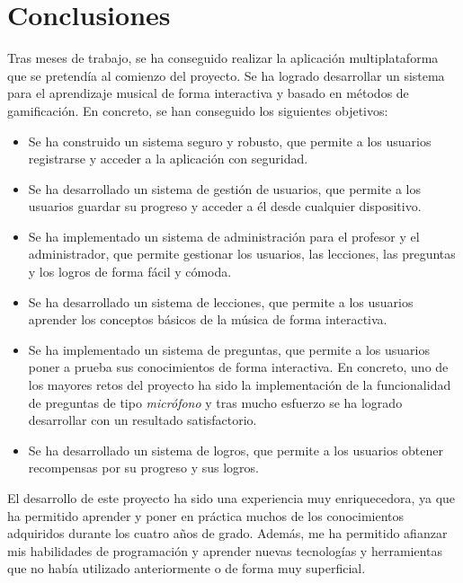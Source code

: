 \chapter{Conclusiones}
\label{cap:conclusiones}
Tras meses de trabajo, se ha conseguido realizar la aplicación multiplataforma que se pretendía al comienzo del proyecto. 
Se ha logrado desarrollar un sistema para el aprendizaje musical de forma interactiva y basado en métodos de gamificación. En concreto, se han conseguido
los siguientes objetivos:
\begin{itemize}
    \item Se ha construido un sistema seguro y robusto, que permite a los usuarios registrarse y acceder a la aplicación con seguridad.
    \item Se ha desarrollado un sistema de gestión de usuarios, que permite a los usuarios guardar su progreso y acceder a él desde cualquier dispositivo.
    \item Se ha implementado un sistema de administración para el profesor y el administrador, que permite gestionar los usuarios, las lecciones, las preguntas y los logros de forma fácil y cómoda.
    \item Se ha desarrollado un sistema de lecciones, que permite a los usuarios aprender los conceptos básicos de la música de forma interactiva.
    \item Se ha implementado un sistema de preguntas, que permite a los usuarios poner a prueba sus conocimientos de forma interactiva. En concreto, uno de los mayores retos del proyecto ha sido la implementación de la funcionalidad de preguntas de tipo \textit{micrófono} y tras mucho
    esfuerzo se ha logrado desarrollar con un resultado satisfactorio.
    \item Se ha desarrollado un sistema de logros, que permite a los usuarios obtener recompensas por su progreso y sus logros.
\end{itemize}

El desarrollo de este proyecto ha sido una experiencia muy enriquecedora, ya que ha permitido aprender y poner en práctica muchos de los conocimientos adquiridos durante los cuatro años de grado. Además, me ha permitido afianzar mis habilidades de programación y aprender nuevas tecnologías y herramientas que no había utilizado anteriormente o de forma muy superficial.

